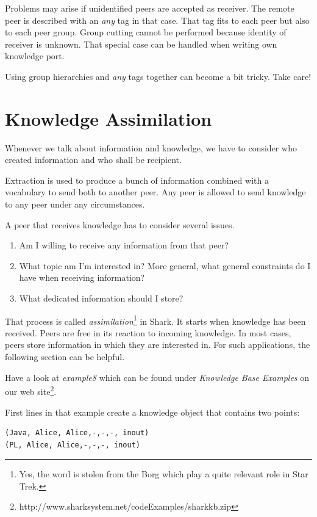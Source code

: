 Problems may arise if unidentified peers are accepted as receiver. The remote peer is described with an {\it any} tag in that case. That tag fits to each peer but also to each peer group. Group cutting cannot be performed because identity of receiver is unknown. That special case can be handled when writing own knowledge port.

Using group hierarchies and {\it any} tags together can become a bit tricky. Take care!

\section{Knowledge Assimilation}
Whenever we talk about information and knowledge, we have to consider who created information and who shall be recipient.

Extraction is used to produce a bunch of information combined with a vocabulary to send both to another peer. Any peer is allowed to send knowledge to any peer under any circumstances.

A peer that receives knowledge has to consider several issues.

\begin{enumerate}
\item
Am I willing to receive any information from that peer?
\item
What topic am I'm interested in? More general, what general constraints do I have when receiving information?
\item
What dedicated information should I store?
\end{enumerate}

That process is called {\it assimilation}\footnote{Yes, the word is stolen from the Borg which play a quite relevant role in Star Trek.} in Shark. It starts when knowledge has been received. Peers are free in its reaction to incoming knowledge. In most cases, peers store information in which they are interested in. For such applications, the following section can be helpful.

Have a look at {\it example8} which can be found under {\it Knowledge Base Examples} on our web
site\footnote{http://www.sharksystem.net/codeExamples/sharkkb.zip}.

First lines in that example create a knowledge object that contains
two points:

\begin{verbatim}
(Java, Alice, Alice,-,-,-, inout)
(PL, Alice, Alice,-,-,-, inout)
\end{verbatim}

